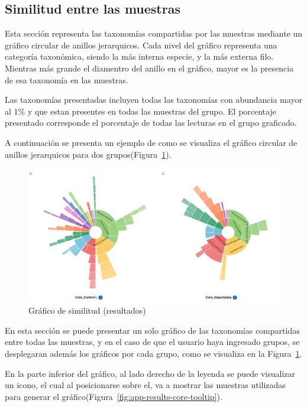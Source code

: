 \subsection{Similitud entre las muestras}
Esta sección representa las taxonomías compartidas por las muestras mediante un gráfico circular de anillos jerarquicos. 
Cada nivel del gráfico representa una categoría taxonómica, siendo la más interna especie, y la más externa filo.
Mientras más grande el diamentro del anillo en el gráfico, mayor es la presencia de esa taxonomía en las muestras.

Las taxonomías presentadas incluyen todas las taxonomías con abundancia mayor al 1\% y que estan presentes en todas las muestras del grupo.
El porcentaje presentado corresponde el porcentaje de todas las lecturas en el grupo graficado.


A continuación se presenta un ejemplo de como se visualiza el gráfico circular de anillos jerarquicos para dos grupos(Figura~\ref{fig:app-results-core}).
\begin{figure}[H]
    \centering
    \includegraphics[width=0.8\linewidth]{images/app/results/core.png}

    \caption{Gráfico de similitud  (resultados)}
    \label{fig:app-results-core}
\end{figure}

En esta sección se puede presentar un solo gráfico de las taxonomías compartidas entre todas las muestras, y en el caso de que el usuario haya ingresado grupos, se desplegaran además los gráficos por cada grupo, como se visualiza en la Figura~\ref{fig:app-results-core}.

En la parte inferior del gráfico, al lado derecho de la leyenda se puede visualizar un icono, el cual al posicionarse sobre el, va a mostrar las muestras utilizadas para generar el gráfico(Figura~\ref{fig:app-results-core-tooltip}).


